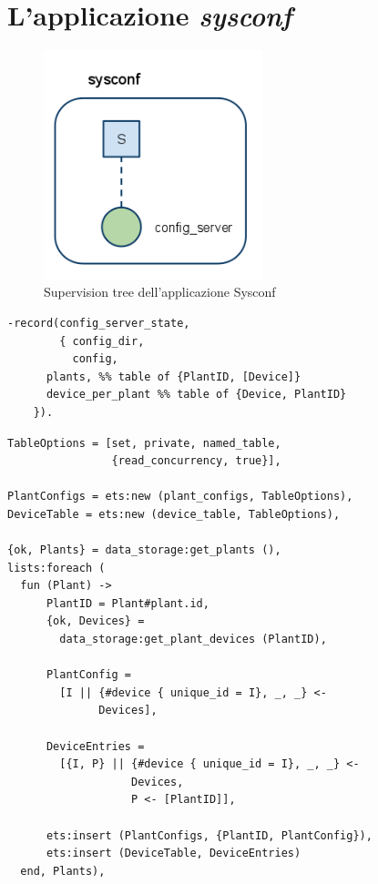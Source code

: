 \section{L'applicazione \emph{sysconf}}
%
\begin{figure}[!h]
\centering
\includegraphics[width=180pt]{img/sysconf.png}
\caption{Supervision tree dell'applicazione Sysconf}
\end{figure}
%
\begin{lstlisting}[caption={Stato del Config Server}, label={code:sysconf-state},frame=trBL]
-record(config_server_state, 
        { config_dir,
          config,
	  plants, %% table of {PlantID, [Device]}
	  device_per_plant %% table of {Device, PlantID}
	}).
\end{lstlisting}
%

\begin{lstlisting}[caption={Lettura della configurazione degli impianti}, label={code:sysconf-conf-making},frame=trBL]
TableOptions = [set, private, named_table, 
                {read_concurrency, true}],

PlantConfigs = ets:new (plant_configs, TableOptions),
DeviceTable = ets:new (device_table, TableOptions),
    
{ok, Plants} = data_storage:get_plants (),
lists:foreach (
  fun (Plant) ->
      PlantID = Plant#plant.id,
      {ok, Devices} = 
        data_storage:get_plant_devices (PlantID),

      PlantConfig = 
        [I || {#device { unique_id = I}, _, _} <- 
              Devices],

      DeviceEntries = 
        [{I, P} || {#device { unique_id = I}, _, _} <-
                   Devices,
                   P <- [PlantID]],
	      
      ets:insert (PlantConfigs, {PlantID, PlantConfig}),
      ets:insert (DeviceTable, DeviceEntries)
  end, Plants),
\end{lstlisting}
%

